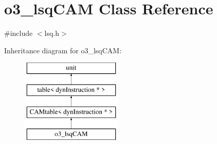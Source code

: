\hypertarget{classo3__lsqCAM}{
\section{o3\_\-lsqCAM Class Reference}
\label{classo3__lsqCAM}
}


{\ttfamily \#include $<$lsq.h$>$}

Inheritance diagram for o3\_\-lsqCAM:\begin{figure}[H]
\begin{center}
\leavevmode
\includegraphics[height=4.000000cm]{classo3__lsqCAM}
\end{center}
\end{figure}
